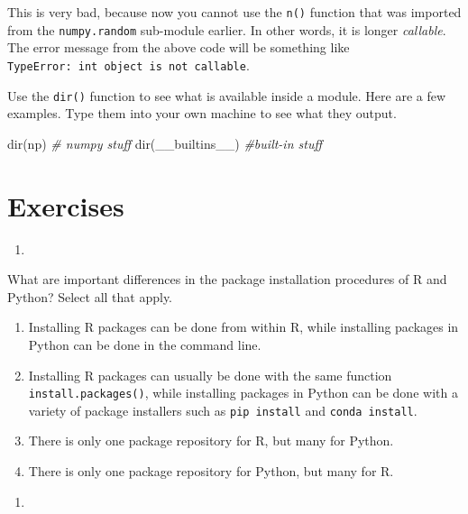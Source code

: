 \documentclass[12pt,krantz2]{krantz}
\makeatletter
\newenvironment{Shaded}{\begin{snugshade}}{\end{snugshade}}
\newcommand{\BuiltInTok}[1]{#1}
\newcommand{\CommentTok}[1]{\textcolor[rgb]{0.37,0.37,0.37}{\textit{#1}}}
\newcommand{\NormalTok}[1]{#1}
\providecommand{\tightlist}{%
  \setlength{\itemsep}{0pt}\setlength{\parskip}{0pt}}
\newenvironment{kframe}{%
\medskip{}
\setlength{\fboxsep}{.8em}
 \def\at@end@of@kframe{}%
 \ifinner\ifhmode%
  \def\at@end@of@kframe{\end{minipage}}%
  \begin{minipage}{\columnwidth}%
 \fi\fi%
 \def\FrameCommand##1{\hskip\@totalleftmargin \hskip-\fboxsep
 \colorbox{shadecolor}{##1}\hskip-\fboxsep
     \hskip-\linewidth \hskip-\@totalleftmargin \hskip\columnwidth}%
 \MakeFramed {\advance\hsize-\width
   \@totalleftmargin\z@ \linewidth\hsize
   \@setminipage}}%
 {\par\unskip\endMakeFramed%
 \at@end@of@kframe}
\renewenvironment{Shaded}{\begin{kframe}}{\end{kframe}}
\makeatother
\begin{document}
This is very bad, because now you cannot use the \texttt{n()} function that was imported from the \texttt{numpy.random} sub-module earlier. In other words, it is longer \emph{callable}. The error message from the above code will be something like \texttt{TypeError:\ \textquotesingle{}int\textquotesingle{}\ object\ is\ not\ callable}.

Use the \texttt{dir()} function to see what is available inside a module. Here are a few examples. Type them into your own machine to see what they output.

\begin{Shaded}
\begin{Highlighting}[]
\BuiltInTok{dir}\NormalTok{(np) }\CommentTok{# numpy stuff}
\BuiltInTok{dir}\NormalTok{(__builtins__) }\CommentTok{#built-in stuff}
\end{Highlighting}
\end{Shaded}

\hypertarget{exercises-8}{%
\section{Exercises}\label{exercises-8}}

\begin{enumerate}
\def\labelenumi{\arabic{enumi}.}
\item
\end{enumerate}

What are important differences in the package installation procedures of R and Python? Select all that apply.

\begin{enumerate}
\def\labelenumi{\alph{enumi})}
\tightlist
\item
  Installing R packages can be done from within R, while installing packages in Python can be done in the command line.
\item
  Installing R packages can usually be done with the same function \texttt{install.packages()}, while installing packages in Python can be done with a variety of package installers such as \texttt{pip\ install} and \texttt{conda\ install}.
\item
  There is only one package repository for R, but many for Python.
\item
  There is only one package repository for Python, but many for R.
\end{enumerate}

\begin{enumerate}
\def\labelenumi{\arabic{enumi}.}
\setcounter{enumi}{1}
\item
\end{enumerate}
\end{document}
